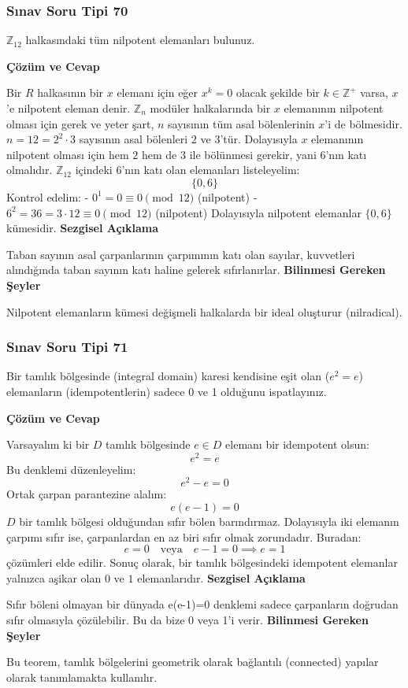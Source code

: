 \documentclass[11pt, a4paper]{article}
\newenvironment{cozum}{
    \vspace{0.5cm}
    \noindent\textcolor{green!60!black}{\faCheckCircle\enspace \textbf{\Large Çözüm ve Cevap}}\par\vspace{0.2cm}
}{}
\newenvironment{sezgisel}{
    \vspace{0.5cm}
    \noindent\textcolor{orange!80!black}{\faLightbulb\enspace \textbf{\Large Sezgisel Açıklama}}\par\vspace{0.2cm}
    \itshape
}{}
\newenvironment{bilgi}{
    \vspace{0.5cm}
    \noindent\textcolor{red!70!black}{\faExclamationTriangle\enspace \textbf{\Large Bilinmesi Gereken Şeyler}}\par\vspace{0.2cm}
}{}
\begin{document}
\subsubsection{Sınav Soru Tipi 70}
\begin{sinavbox}
$\mathbb{Z}_{12}$ halkasındaki tüm nilpotent elemanları bulunuz.
\end{sinavbox}
\begin{cozum}
Bir $R$ halkasının bir $x$ elemanı için eğer $x^k = 0$ olacak şekilde bir $k \in \mathbb{Z}^+$ varsa, $x$'e nilpotent eleman denir.
$\mathbb{Z}_n$ modüler halkalarında bir $x$ elemanının nilpotent olması için gerek ve yeter şart, $n$ sayısının tüm asal bölenlerinin $x$'i de bölmesidir.
$n = 12 = 2^2 \cdot 3$ sayısının asal bölenleri $2$ ve $3$'tür.
Dolayısıyla $x$ elemanının nilpotent olması için hem $2$ hem de $3$ ile bölünmesi gerekir, yani $6$'nın katı olmalıdır.
$\mathbb{Z}_{12}$ içindeki 6'nın katı olan elemanları listeleyelim:
\[ \{0, 6\} \]
Kontrol edelim:
- $0^1 = 0 \equiv 0 \pmod{12}$ (nilpotent)
- $6^2 = 36 = 3 \cdot 12 \equiv 0 \pmod{12}$ (nilpotent)
Dolayısıyla nilpotent elemanlar $\{0, 6\}$ kümesidir.
\end{cozum}
\begin{sezgisel}
Taban sayının asal çarpanlarının çarpımının katı olan sayılar, kuvvetleri alındığında taban sayının katı haline gelerek sıfırlanırlar.
\end{sezgisel}
\begin{bilgi}
Nilpotent elemanların kümesi değişmeli halkalarda bir ideal oluşturur (nilradical).
\end{bilgi}

\newpage
\subsubsection{Sınav Soru Tipi 71}
\begin{sinavbox}
Bir tamlık bölgesinde (integral domain) karesi kendisine eşit olan ($e^2 = e$) elemanların (idempotentlerin) sadece 0 ve 1 olduğunu ispatlayınız.
\end{sinavbox}
\begin{cozum}
Varsayalım ki bir $D$ tamlık bölgesinde $e \in D$ elemanı bir idempotent olsun:
\[ e^2 = e \]
Bu denklemi düzenleyelim:
\[ e^2 - e = 0 \]
Ortak çarpan parantezine alalım:
\[ e(e - 1) = 0 \]
$D$ bir tamlık bölgesi olduğundan sıfır bölen barındırmaz. Dolayısıyla iki elemanın çarpımı sıfır ise, çarpanlardan en az biri sıfır olmak zorundadır.
Buradan:
\[ e = 0 \quad \text{veya} \quad e - 1 = 0 \implies e = 1 \]
çözümleri elde edilir.
Sonuç olarak, bir tamlık bölgesindeki idempotent elemanlar yalnızca aşikar olan $0$ ve $1$ elemanlarıdır.
\end{cozum}
\begin{sezgisel}
Sıfır böleni olmayan bir dünyada e(e-1)=0 denklemi sadece çarpanların doğrudan sıfır olmasıyla çözülebilir. Bu da bize 0 veya 1'i verir.
\end{sezgisel}
\begin{bilgi}
Bu teorem, tamlık bölgelerini geometrik olarak bağlantılı (connected) yapılar olarak tanımlamakta kullanılır.
\end{bilgi}
\end{document}
